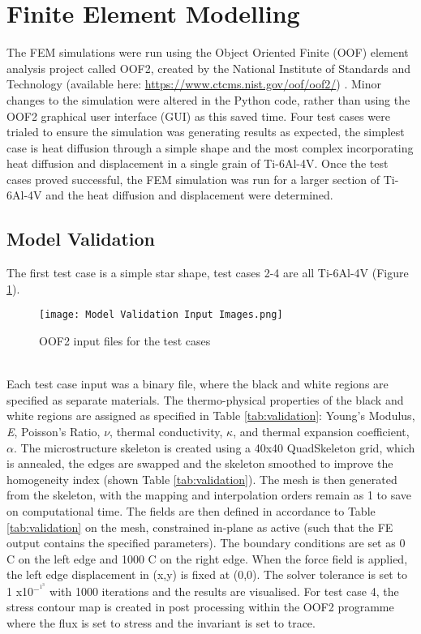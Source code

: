 \documentclass[report.tex]{subfiles}
\begin{document}
\section{Finite Element Modelling}
The FEM simulations were run using the Object Oriented Finite (OOF) element analysis project called OOF2, created by the National Institute of Standards and Technology (available here: \url{https://www.ctcms.nist.gov/oof/oof2/}) \cite{OOF2Modelling}. Minor changes to the simulation were altered in the Python code, rather than using the OOF2 graphical user interface (GUI) as this saved time. Four test cases were trialed to ensure the simulation was generating results as expected, the simplest case is heat diffusion through a simple shape and the most complex incorporating heat diffusion and displacement in a single grain of Ti-6Al-4V. Once the test cases proved successful, the FEM simulation was run for a larger section of Ti-6Al-4V and the heat diffusion and displacement were determined.

\subsection{Model Validation}
The first test case is a simple star shape, test cases 2-4 are all Ti-6Al-4V (Figure \ref{fig:OOF2Input}).
\\
\begin{figure}[h]
    \centering
    \texttt{[image: Model Validation Input Images.png]}
    \caption{OOF2 input files for the test cases}
    \label{fig:OOF2Input}
\end{figure}
\\
Each test case input was a binary file, where the black and white regions are specified as separate materials. The thermo-physical properties of the black and white regions are assigned as specified in Table \ref{tab:validation}: Young's Modulus, \textit{E}, Poisson's Ratio, $\nu$, thermal conductivity, $\kappa$, and thermal expansion coefficient, $\alpha$. The microstructure skeleton is created using a 40x40 QuadSkeleton grid, which is annealed, the edges are swapped and the skeleton smoothed to improve the homogeneity index (shown Table \ref{tab:validation}). The mesh is then generated from the skeleton, with the mapping and interpolation orders remain as 1 to save on computational time. The fields are then defined in accordance to Table \ref{tab:validation} on the mesh, constrained in-plane as active (such that the FE output contains the specified parameters). The boundary conditions are set as 0 \degree C on the left edge and 1000 \degree C on the right edge. When the force field is applied, the left edge displacement in (x,y) is fixed at (0,0). The solver tolerance is set to 1 x10$^-^1^3$ with 1000 iterations and the results are visualised. For test case 4, the stress contour map is created in post processing within the OOF2 programme where the flux is set to stress and the invariant is set to trace.
\end{document}
